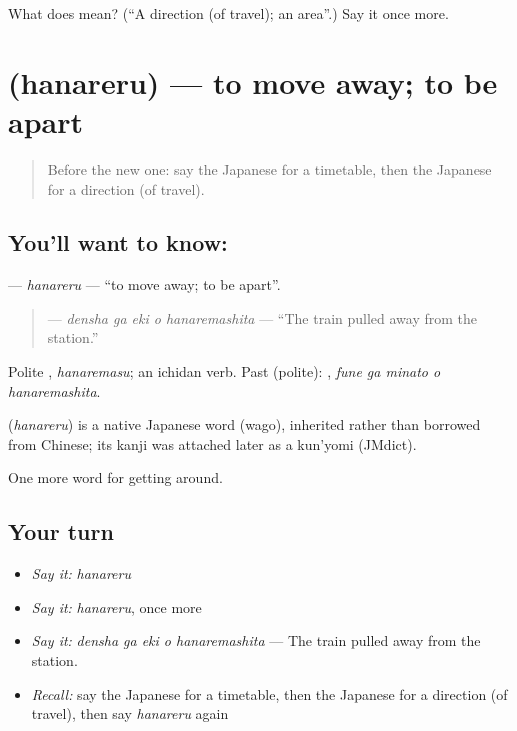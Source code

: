 \begin{tcolorbox}[breakable,colback=teal!4,colframe=teal!35!black,title={Before you move on}]
What does  mean? (\textquotedblleft{}A direction (of travel); an area\textquotedblright{}.) Say it once more.
\end{tcolorbox}
\section[\texorpdfstring{\ja{はなれる} (hanareru)}{はなれる (hanareru)}]{ (hanareru) — to move away; to be apart}

\label{lesson:JA-C377-hanareru}



\begin{quote}
Before the new one: say the Japanese for a timetable, then the Japanese for a direction (of travel).
\end{quote}

\subsection*{You'll want to know: }
\textbf{} — \emph{hanareru} — \textquotedblleft{}to move away; to be apart\textquotedblright{}.

\begin{quote}
\textbf{  } — \emph{densha ga eki o hanaremashita} — \textquotedblleft{}The train pulled away from the station.\textquotedblright{}
\end{quote}

Polite \textbf{}, \emph{hanaremasu}; an ichidan verb. Past (polite): \textbf{  }, \emph{fune ga minato o hanaremashita}.

\begin{cousinweb}
\textbf{} (\emph{hanareru}) is a native Japanese word (wago), inherited rather than borrowed from Chinese; its kanji was attached later as a kun'yomi (JMdict).
\end{cousinweb}

\begin{grammarlens}[title={What you've built}]
One more word for getting around.
\end{grammarlens}

\subsection*{Your turn}
\begin{itemize}
\raggedright
  \item \emph{Say it:} \emph{hanareru}
  \item \emph{Say it:} \emph{hanareru}, once more
  \item \emph{Say it:} \emph{densha ga eki o hanaremashita} — The train pulled away from the station.
  \item \emph{Recall:} say the Japanese for a timetable, then the Japanese for a direction (of travel), then say \emph{hanareru} again
\end{itemize}

